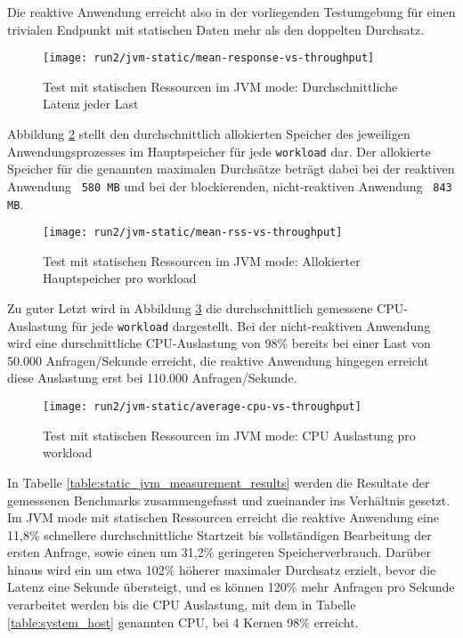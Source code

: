 Die reaktive Anwendung erreicht also in der vorliegenden Testumgebung für einen trivialen
Endpunkt mit statischen Daten mehr als den doppelten Durchsatz.
\newpage
\begin{figure}[ht!]
    \texttt{[image: run2/jvm-static/mean-response-vs-throughput]}
    \caption{Test mit statischen Ressourcen im JVM mode: Durchschnittliche Latenz jeder Last}
    \label{fig:jvm_static_mean_response}
\end{figure}
Abbildung \ref{fig:jvm_static_mean_rss} stellt den durchschnittlich allokierten Speicher des jeweiligen Anwendungsprozesses
im Hauptspeicher für jede \verb|workload| dar. Der allokierte Speicher für die genannten maximalen Durchsätze beträgt dabei bei
der reaktiven Anwendung ~\verb|580 MB| und bei der blockierenden, nicht-reaktiven Anwendung ~\verb|843 MB|.
\newpage
\begin{figure}[ht!]
    \texttt{[image: run2/jvm-static/mean-rss-vs-throughput]}
    \caption{Test mit statischen Ressourcen im JVM mode: Allokierter Hauptspeicher pro workload}
    \label{fig:jvm_static_mean_rss}
\end{figure}
Zu guter Letzt wird in Abbildung \ref{fig:jvm_static_avg_cpu} die durchschnittlich gemessene CPU-Auslastung für jede \verb|workload|
dargestellt. Bei der nicht-reaktiven Anwendung wird eine durschnittliche CPU-Auslastung von 98\% bereits bei einer Last von
50.000 Anfragen/Sekunde erreicht, die reaktive Anwendung hingegen erreicht diese Auslastung erst bei 110.000 Anfragen/Sekunde.
\newpage
\begin{figure}[ht!]
    \centering
    \texttt{[image: run2/jvm-static/average-cpu-vs-throughput]}
    \caption{Test mit statischen Ressourcen im JVM mode: CPU Auslastung pro workload}
    \label{fig:jvm_static_avg_cpu}
\end{figure}

In Tabelle \ref{table:static_jvm_measurement_results} werden die Resultate der gemessenen Benchmarks zusammengefasst
und zueinander ins Verhältnis gesetzt. Im JVM mode mit statischen Ressourcen erreicht die reaktive Anwendung
eine 11,8\% schnellere durchschnittliche Startzeit bis vollständigen Bearbeitung der ersten Anfrage, sowie
einen um 31,2\% geringeren Speicherverbrauch.
Darüber hinaus wird ein um etwa 102\% höherer maximaler Durchsatz erzielt, bevor die Latenz eine Sekunde übersteigt, und
es können 120\% mehr Anfragen pro Sekunde verarbeitet werden bis die CPU Auslastung, mit dem in Tabelle \ref{table:system_host}
genannten CPU, bei 4 Kernen 98\% erreicht.

